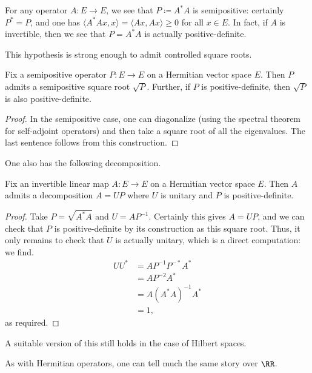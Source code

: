 \documentclass[../notes.tex]{subfiles}
\begin{document}
\begin{example}
	For any operator $A\colon E\to E$, we see that $P\coloneqq A^*A$ is semipositive: certainly $P^*=P$, and one has $\langle A^*Ax,x\rangle=\langle Ax,Ax\rangle\ge0$ for all $x\in E$. In fact, if $A$ is invertible, then we see that $P=A^*A$ is actually positive-definite.
\end{example}
This hypothesis is strong enough to admit controlled square roots.
\begin{proposition}
	Fix a semipositive operator $P\colon E\to E$ on a Hermitian vector space $E$. Then $P$ admits a semipositive square root $\sqrt P$. Further, if $P$ is positive-definite, then $\sqrt P$ is also positive-definite.
\end{proposition}
\begin{proof}
	In the semipositive case, one can diagonalize (using the spectral theorem for self-adjoint operators) and then take a square root of all the eigenvalues. The last sentence follows from this construction.
\end{proof}
One also has the following decomposition.
\begin{theorem}
	Fix an invertible linear map $A\colon E\to E$ on a Hermitian vector space $E$. Then $A$ admits a decomposition $A=UP$ where $U$ is unitary and $P$ is positive-definite.
\end{theorem}
\begin{proof}
	Take $P=\sqrt{A^*A}$ and $U=AP^{-1}$. Certainly this gives $A=UP$, and we can check that $P$ is positive-definite by its construction as this square root. Thus, it only remains to check that $U$ is actually unitary, which is a direct computation: we find.
	\begin{align*}
		UU^* &= AP^{-1}P^{-*}A^* \\
		&= AP^{-2}A^* \\
		&= A(A^*A)^{-1}A^* \\
		&= 1,
	\end{align*}
	as required.
\end{proof}
\begin{remark}
	A suitable version of this still holds in the case of Hilbert spaces.
\end{remark}
As with Hermitian operators, one can tell much the same story over $\RR$.
\end{document}
